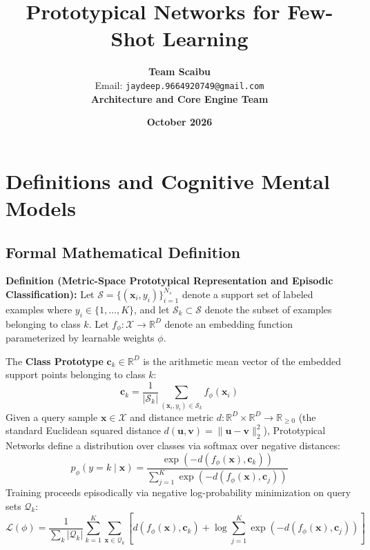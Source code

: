 \documentclass[11pt,a4paper]{article}
\title{\textbf{Prototypical Networks for Few-Shot Learning}}
\author{\textbf{Team Scaibu} \\ \small Email: \texttt{jaydeep.9664920749@gmail.com} \\ \small \textbf{Architecture and Core Engine Team}}
\date{\textbf{October 2026}}
\theoremstyle{definition}
\begin{document}
\maketitle

\section{Definitions and Cognitive Mental Models}

\subsection{Formal Mathematical Definition}
\textbf{Definition (Metric-Space Prototypical Representation and Episodic Classification):}
Let $\mathcal{S} = \{(\mathbf{x}_i, y_i)\}_{i=1}^{N_s}$ denote a support set of labeled examples where $y_i \in \{1, \dots, K\}$, and let $\mathcal{S}_k \subset \mathcal{S}$ denote the subset of examples belonging to class $k$. Let $f_\phi: \mathcal{X} \to \mathbb{R}^D$ denote an embedding function parameterized by learnable weights $\phi$.

The \textbf{Class Prototype} $\mathbf{c}_k \in \mathbb{R}^D$ is the arithmetic mean vector of the embedded support points belonging to class $k$:
{\boldmath
\begin{equation}
\mathbf{c}_k = \frac{1}{|\mathcal{S}_k|} \sum_{(\mathbf{x}_i, y_i) \in \mathcal{S}_k} f_\phi(\mathbf{x}_i)
\end{equation}
}
Given a query sample $\mathbf{x} \in \mathcal{X}$ and distance metric $d: \mathbb{R}^D \times \mathbb{R}^D \to \mathbb{R}_{\ge 0}$ (the standard Euclidean squared distance $d(\mathbf{u}, \mathbf{v}) = \|\mathbf{u} - \mathbf{v}\|_2^2$), Prototypical Networks define a distribution over classes via softmax over negative distances:
{\boldmath
\begin{equation}
p_\phi(y = k \mid \mathbf{x}) = \frac{\exp\left( -d(f_\phi(\mathbf{x}), \mathbf{c}_k) \right)}{\sum_{j=1}^K \exp\left( -d(f_\phi(\mathbf{x}), \mathbf{c}_j) \right)}
\end{equation}
}
Training proceeds episodically via negative log-probability minimization on query sets $\mathcal{Q}_k$:
{\boldmath
\begin{equation}
\mathcal{L}(\phi) = \frac{1}{\sum_k |\mathcal{Q}_k|} \sum_{k=1}^K \sum_{\mathbf{x} \in \mathcal{Q}_k} \left[ d(f_\phi(\mathbf{x}), \mathbf{c}_k) + \log \sum_{j=1}^K \exp\left( -d(f_\phi(\mathbf{x}), \mathbf{c}_j) \right) \right]
\end{equation}
}
\end{document}
